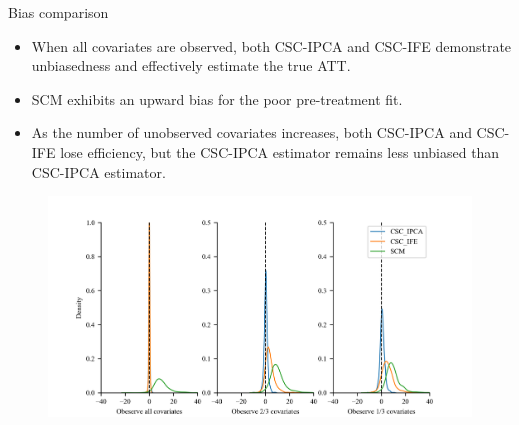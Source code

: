 \documentclass{beamer}
\begin{document}
\begin{frame}{Bias comparison}
\begin{itemize}
    \item When all covariates are observed, both CSC-IPCA and CSC-IFE demonstrate unbiasedness and effectively estimate the true ATT.
    \item SCM exhibits an upward bias for the poor pre-treatment fit.
    \item As the number of unobserved covariates increases, both CSC-IPCA and CSC-IFE lose efficiency, but the CSC-IPCA estimator remains less unbiased than CSC-IPCA estimator.
\end{itemize}
\begin{figure}
    \centering
    \includegraphics[scale=0.5]{figs/bias_compar1.png}
\end{figure}
\end{frame}
\end{document}

